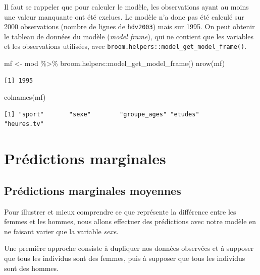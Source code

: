 \documentclass[
  letterpaper,
  DIV=11,
  numbers=noendperiod,
  oneside]{scrreprt}
\newenvironment{Shaded}{\begin{snugshade}}{\end{snugshade}}
\newcommand{\FunctionTok}[1]{\textcolor[rgb]{0.28,0.35,0.67}{#1}}
\newcommand{\NormalTok}[1]{\textcolor[rgb]{0.00,0.23,0.31}{#1}}
\newcommand{\OtherTok}[1]{\textcolor[rgb]{0.00,0.23,0.31}{#1}}
\newcommand{\SpecialCharTok}[1]{\textcolor[rgb]{0.37,0.37,0.37}{#1}}
\begin{document}
Il faut se rappeler que pour calculer le modèle, les observations ayant
au moins une valeur manquante ont été exclues. Le modèle n'a donc pas
été calculé sur 2000 observations (nombre de lignes de \texttt{hdv2003})
mais sur 1995. On peut obtenir le tableau de données du modèle
(\emph{model frame}), qui ne contient que les variables et les
observations utilisées, avec
\texttt{broom.helpers::model\_get\_model\_frame()}.

\begin{Shaded}
\begin{Highlighting}[]
\NormalTok{mf }\OtherTok{\textless{}{-}}\NormalTok{ mod }\SpecialCharTok{\%\textgreater{}\%}
\NormalTok{  broom.helpers}\SpecialCharTok{::}\FunctionTok{model\_get\_model\_frame}\NormalTok{()}
\FunctionTok{nrow}\NormalTok{(mf)}
\end{Highlighting}
\end{Shaded}

\begin{verbatim}
[1] 1995
\end{verbatim}

\begin{Shaded}
\begin{Highlighting}[]
\FunctionTok{colnames}\NormalTok{(mf)}
\end{Highlighting}
\end{Shaded}

\begin{verbatim}
[1] "sport"       "sexe"        "groupe_ages" "etudes"      "heures.tv"  
\end{verbatim}

\hypertarget{sec-predictions-marginales}{%
\section{Prédictions marginales}\label{sec-predictions-marginales}}

\hypertarget{pruxe9dictions-marginales-moyennes}{%
\subsection{Prédictions marginales
moyennes}\label{pruxe9dictions-marginales-moyennes}}

Pour illustrer et mieux comprendre ce que représente la différence entre
les femmes et les hommes, nous allons effectuer des prédictions avec
notre modèle en ne faisant varier que la variable \emph{sexe}.

Une première approche consiste à dupliquer nos données observées et à
supposer que tous les individus sont des femmes, puis à supposer que
tous les individus sont des hommes.
\end{document}

